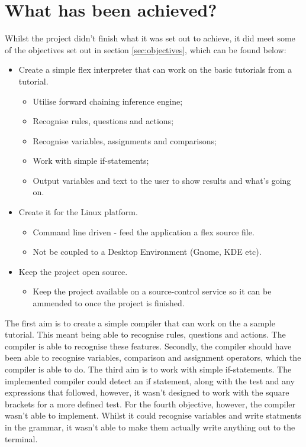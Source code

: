 \documentclass[12pt]{report}
\begin{document}
\section{What has been achieved?}\label{sec:con:achieved}
Whilst the project didn't finish what it was set out to achieve, it did meet some of the objectives set out in section \ref{sec:objectives}, which can be found below:\\
\begin{itemize}
\item Create a simple flex interpreter that can work on the basic tutorials from a tutorial.
	\begin{itemize}
	\item Utilise forward chaining inference engine;
	\item Recognise rules, questions and actions;
	\item Recognise variables, assignments and comparisons;
	\item Work with simple if-statements;
	\item Output variables and text to the user to show results and what's going on.
	\end{itemize}
\item Create it for the Linux platform.
	\begin{itemize}
	\item Command line driven - feed the application a flex source file.
	\item Not be coupled to a Desktop Environment (Gnome, KDE etc).
	\end{itemize}
\item Keep the project open source.
	\begin{itemize}
	\item Keep the project available on a source-control service so it can be ammended to once the project is finished.\\
	\end{itemize}
\end{itemize}
The first aim is to create a simple compiler that can work on the a sample tutorial.  This meant being able to recognise rules, questions and actions.  The compiler is able to recognise these features.  Secondly, the compiler should have been able to recognise variables, comparison and assignment operators, which the compiler is able to do.  The third aim is to work with simple if-statements.  The implemented compiler could detect an if statement, along with the test and any expressions that followed, however, it wasn't designed to work with the square brackets for a more defined test.  For the fourth objective, however, the compiler wasn't able to implement.  Whilst it could recognise variables and write statments in the grammar, it wasn't able to make them actually write anything out to the terminal.\\
\end{document}
